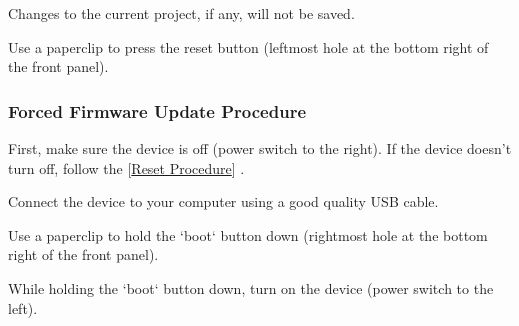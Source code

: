 \documentclass[10pt]{article}
\newcommand{\reflabel}[2]{
[\hyperref[#1]{#2}]
}
\begin{document}
\begin{multicols*}{2}
\begin{important}
Changes to the current project, if any, will not be saved.
\end{important}

Use a paperclip to press the reset button (leftmost hole at the bottom right of the front panel).

\subsubsection{Forced Firmware Update Procedure}

First, make sure the device is off (power switch to the right). If the device doesn't turn off, follow the \reflabel{procedures:reset}{Reset Procedure}.

Connect the device to your computer using a good quality USB cable.

Use a paperclip to hold the `boot` button down (rightmost hole at the bottom right of the front panel).

While holding the `boot` button down, turn on the device (power switch to the left).

\end{multicols*}
\end{document}
